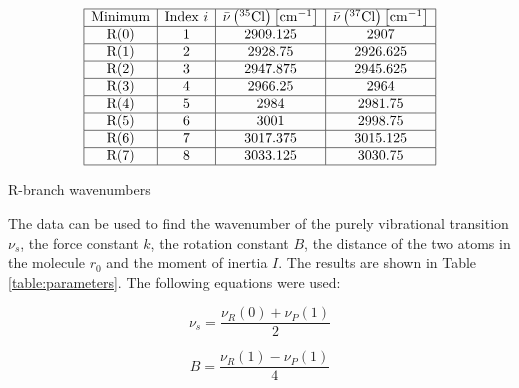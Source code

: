 \documentclass{article}
\begin{document}
\begin{table}[H]
    \centering
    \[
    \begin{array}{|c|c|c|c|}
    \hline \text{Minimum} & \text{Index } i & \bar{\nu}\left({ }^{35} \mathrm{Cl}\right)\left[\mathrm{cm}^{-1}\right] & \bar{\nu}\left({ }^{37} \mathrm{Cl}\right)\left[\mathrm{cm}^{-1}\right] \\
    \hline \text{R(0)} & 1 & 2909.125 & 2907 \\
    \hline \text{R(1)} & 2 & 2928.75 & 2926.625 \\
    \hline \text{R(2)} & 3 & 2947.875 & 2945.625 \\
    \hline \text{R(3)} & 4 & 2966.25 & 2964 \\
    \hline \text{R(4)} & 5 & 2984 & 2981.75 \\
    \hline \text{R(5)} & 6 & 3001 & 2998.75 \\
    \hline \text{R(6)} & 7 & 3017.375 & 3015.125 \\
    \hline \text{R(7)} & 8 & 3033.125 & 3030.75 \\
    \hline
    \end{array}
    \]
    \caption{R-branch wavenumbers}
    \label{table:wavenumbersR}
\end{table}

The data can be used to find the wavenumber of the purely vibrational transition $\nu_s$, the force constant $k$, the rotation constant $B$, the distance of the two atoms in the molecule $r_0$ and the moment of inertia $I$. The results are shown in Table \ref{table:parameters}. The following equations were used:

\begin{equation}
	\nu_s = \frac{\nu_R(0) + \nu_P(1)}{2}
\end{equation}

\begin{equation}
	B = \frac{\nu_R(1) - \nu_P(1)}{4}
\end{equation}
\end{document}
